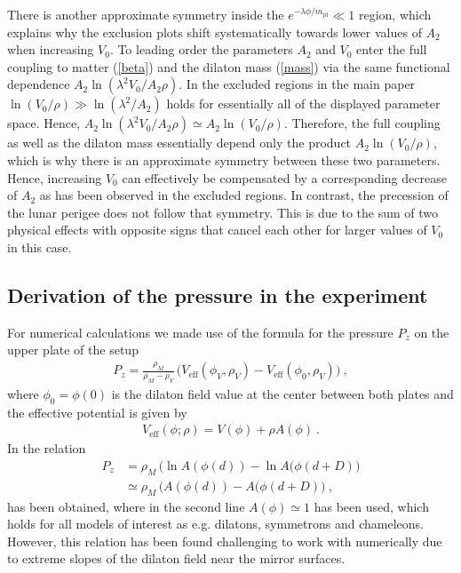 \documentclass[aps,pra,twocolumn,floatfix,superscriptaddress,nofootinbib,showpacs,a4paper,balancelastpage,twoside]{revtex4-2}
\newcommand{\cannex}{{\sc{Cannex}}}				%
\begin{document}
There is another approximate symmetry inside the $e^{-\lambda \phi / m_{\text{pl}}} \ll 1$ region, which explains why the exclusion plots shift systematically towards lower values of $A_2$ when increasing $V_0$. To leading order the parameters $A_2$ and $V_0$ enter the full coupling to matter (\ref{beta}) and the dilaton mass (\ref{mass}) via the same functional dependence $ A_2 \ln\left(\lambda^2 V_0 / A_2 \rho\right)$. In the excluded regions in the main paper $\ln\left(V_0 /\rho\right) \gg \ln\left(\lambda^2 /A_2\right) $ holds for essentially all of the displayed parameter space. Hence, $ A_2 \ln\left(\lambda^2 V_0 / A_2 \rho\right) \simeq A_2  \ln\left(V_0 / \rho\right) $. Therefore, the full coupling as well as the dilaton mass essentially depend only the product  $A_2  \ln\left(V_0 / \rho\right)$, which is why there is an approximate symmetry between these two parameters. Hence, increasing $V_0$ can effectively be compensated by a corresponding decrease of $A_2$ as has been observed in the excluded regions. In contrast, the precession of the lunar perigee does not follow that symmetry. This is due to the sum of two physical effects with opposite signs that cancel each other for larger values of $V_0$ in this case.

\subsection{Derivation of the pressure in the \cannex{} experiment}\label{AppSM3} 

For numerical calculations we made use of the formula for the pressure $P_z$ on the upper plate of the \cannex{} setup
\begin{align}
P_z = \frac{\rho_M}{\rho_M-\rho_V}\,\big(V_{\text{eff}}(\phi_V,\rho_V)-V_{\text{eff}}(\phi_0,\rho_V)\big)\>, \label{newpress}
\end{align}
where $\phi_0 = \phi(0)$ is the dilaton field value at the center between both plates 
and the effective potential is given by
\begin{align}
V_{\text{eff}}(\phi;\rho) = V(\phi) + \rho A(\phi)\>.
\end{align}
In \cite{Brax:2022uyh} the relation 
\begin{align}
P_z&=\rho_M\,\big(\ln A(\phi(d))-\ln A(\phi(d+D)\big) \nonumber\\
&\simeq \rho_M\,\big(A(\phi(d))-A(\phi(d+D)\big)\>, \label{press}
\end{align}
has been obtained, where in the second line $A(\phi)\simeq 1$ has been used, which holds for all models of interest as e.g. dilatons, symmetrons and chameleons.
However, this relation has been found challenging to work with numerically due to extreme slopes of the dilaton field near the mirror surfaces.  
\end{document}
